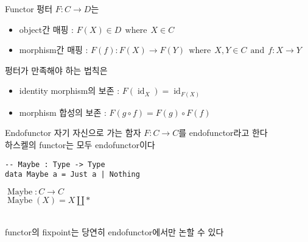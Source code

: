 \documentclass[t]{beamer}
\newcommand\where[0]{\ \ \text{where} \ \ }
\newcommand\st[1]{\ \ \text{#1} \ \ }
\newcommand\ctid[1]{\operatorname{id}_{#1}}
\begin{document}
\begin{frame}[fragile]{Functor}
  펑터 \(F : C \to D\)는
  \begin{itemize}
    \item object간 매핑 : \(F(X) \in D \where X \in C \)
    \item morphism간 매핑 : \(F(f) : F(X) \to F(Y) \where X, Y \in C \st{and} f : X \to Y \)
  \end{itemize}
  \pause
  펑터가 만족해야 하는 법칙은
  \begin{itemize}
    \item identity morphism의 보존 : \( F(\ctid{X}) = \ctid{F(X)} \)
    \item morphism 합성의 보존 : \( F(g \circ f) = F(g) \circ F(f) \)
  \end{itemize}
\end{frame}

\begin{frame}[fragile]{Endofunctor}
  자기 자신으로 가는 함자 \(F : C \to C\)를 endofunctor라고 한다\newline \\
  \pause
  하스켈의 functor는 모두 endofunctor이다 \newline\\
  \begin{minipage}[t]{.6\textwidth}
\begin{verbatim}
-- Maybe : Type -> Type
data Maybe a = Just a | Nothing
\end{verbatim}
  \end{minipage}
  \begin{minipage}[t]{.35\textwidth}
    \( \operatorname{Maybe} : C \to C \)\\
    \( \operatorname{Maybe}(X) = X \coprod \ast \)
  \end{minipage}
  \vspace{0.5cm}
  \pause
  \\functor의 fixpoint는 당연히 endofunctor에서만 논할 수 있다
\end{frame}
\end{document}
